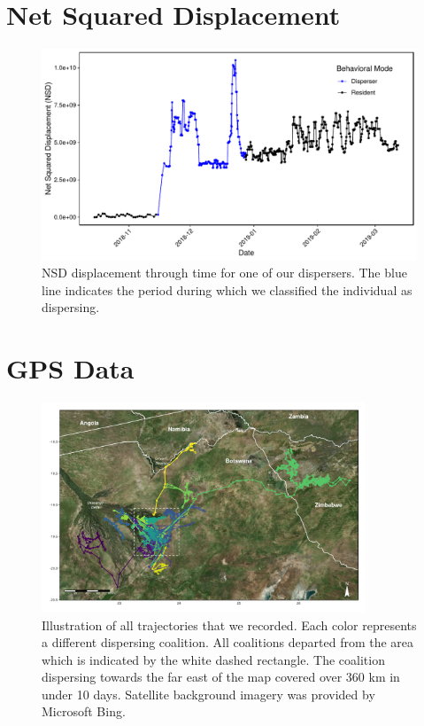 \documentclass[abstract=off,10pt,a4paper,bibliography=totocnumbered]{article}
\begin{document}
\section{Net Squared Displacement}

\begin{figure}[hbpt]
  \begin{center}
    \includegraphics[width = \textwidth]{99_NSD.pdf}
    \caption{NSD displacement through time for one of our dispersers. The blue
    line indicates the period during which we classified the individual as
    dispersing.}
    \label{NSD}
  \end{center}
\end{figure}

\newpage
\section{GPS Data}
\begin{figure}[hbtp]
  \begin{center}
    \includegraphics[width = 0.86\textwidth]{99_Trajectories.pdf}
    \caption{Illustration of all trajectories that we recorded. Each color
    represents a different dispersing coalition. All coalitions departed from
    the area which is indicated by the white dashed rectangle. The coalition
    dispersing towards the far east of the map covered over 360 km in under 10
    days. Satellite background imagery was provided by Microsoft Bing.}
    \label{Trajectories}
  \end{center}
\end{figure}
\end{document}
